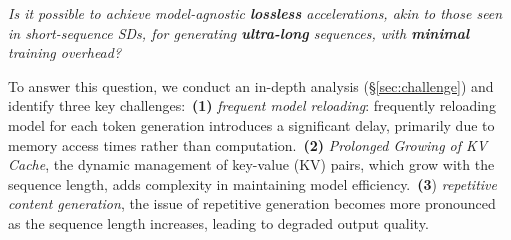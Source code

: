 \textit{Is it possible to achieve model-agnostic \textbf{lossless} accelerations, akin to those seen in short-sequence SDs, for generating \textbf{ultra-long} sequences, with \textbf{minimal} training overhead?}

To answer this question, we conduct an in-depth analysis (\S \ref{sec:challenge}) and identify three key challenges:\,
\textbf{(1)} \textit{frequent model reloading}: frequently reloading model for each token generation introduces a significant delay, primarily due to memory access times rather than computation.\,
\textbf{(2)} \textit{Prolonged Growing of KV Cache}, the dynamic management of key-value (KV) pairs, which grow with the sequence length, adds complexity in maintaining model efficiency.\,
\textbf{(3}) \textit{repetitive content generation}, the issue of repetitive generation becomes more pronounced as the sequence length increases, leading to degraded output quality.

